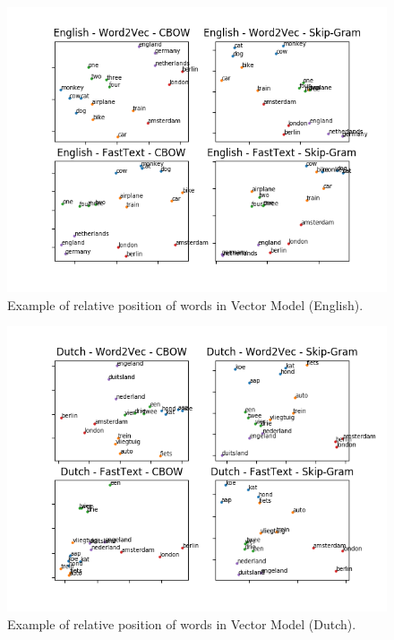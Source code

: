 \documentclass{article}
\begin{document}
\newpage

\begin{figure}
    \centering
    \includegraphics[width=\textwidth]{imgs/embedding_en.png}
    \caption{Example of relative position of words in Vector Model (English).}
    \label{fig:embedding_en}
\end{figure}

\begin{figure}
    \centering
    \includegraphics[width=\textwidth]{imgs/embedding_nl.png}
    \caption{Example of relative position of words in Vector Model (Dutch).}
    \label{fig:embedding_nl}
\end{figure}
\end{document}
